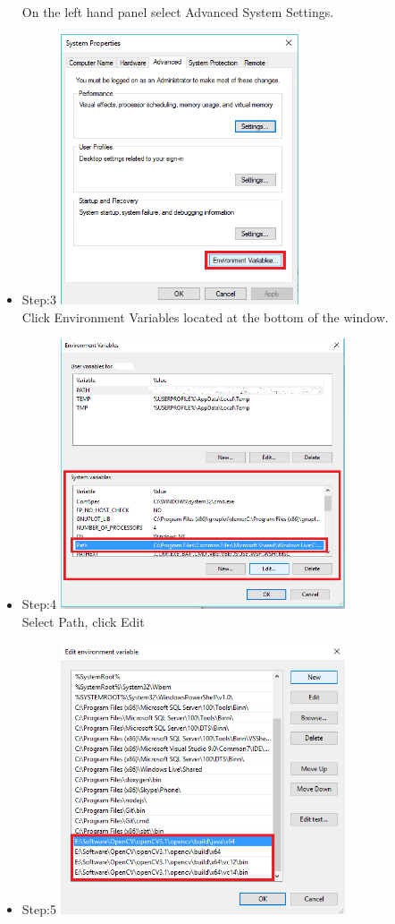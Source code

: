 \documentclass[a4paper,12pt]{report}
\begin{document}
\begin{itemize}
		On the left hand panel select Advanced System Settings.
		\pagebreak
		\item Step:3	\linebreak
		\includegraphics[height=8cm]{../Images/003.png}\\
		\linebreak
		Click Environment Variables located at the bottom of the window.
		\item Step:4	\linebreak
		\includegraphics[height=8cm]{../Images/004.png}\\
		\linebreak
		Select Path, click Edit
		\pagebreak
		\item Step:5	\linebreak
		\includegraphics[height=8cm]{../Images/005.png}\\

\end{itemize}
\end{document}
